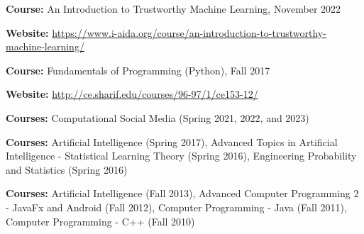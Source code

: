 \documentclass[11pt]{article}
\begin{document}
\begin{outerlist}

{\begin{innerlist}
  \item[] \textbf{Course:} An Introduction to Trustworthy Machine Learning, {November 2022}
  \item[] \textbf{Website:} \href{https://www.i-aida.org/course/an-introduction-to-trustworthy-machine-learning/}{https://www.i-aida.org/course/an-introduction-to-trustworthy-machine-learning/}
\end{innerlist}}

{\begin{innerlist}
  \item[] \textbf{Course:} Fundamentals of Programming (Python), Fall 2017
  \item[] \textbf{Website:} \href{http://ce.sharif.edu/courses/96-97/1/ce153-12/}{http://ce.sharif.edu/courses/96-97/1/ce153-12/}
\end{innerlist}}

{\begin{innerlist}
  \item[] \textbf{Courses:} Computational Social Media (Spring 2021, 2022, and 2023)
\end{innerlist}}

{\begin{innerlist}
  \item[] \textbf{Courses:} Artificial Intelligence (Spring 2017),
  Advanced Topics in Artificial Intelligence - Statistical Learning Theory (Spring 2016),
  Engineering Probability and Statistics (Spring 2016)
\end{innerlist}
}

{\begin{innerlist}
  \item[] \textbf{Courses:} Artificial Intelligence (Fall 2013),
  Advanced Computer Programming 2 - JavaFx and Android  (Fall 2012),
  Computer Programming - Java (Fall 2011),
  Computer Programming - C++ (Fall 2010)
\end{innerlist}}

\end{outerlist}
\end{document}

